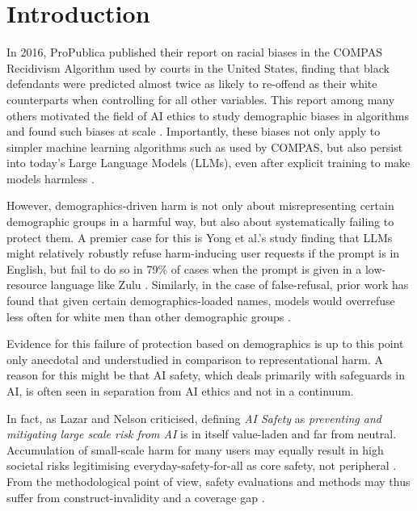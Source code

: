 \chapter{Introduction}
\label{chap:intro}


In 2016, ProPublica \cite{angwin2016machine} published their report on racial biases in the COMPAS Recidivism Algorithm used by courts in the United States, finding that black defendants were predicted almost twice as likely to re-offend as their white counterparts when controlling for all other variables. This report among many others motivated the field of AI ethics to study demographic biases in algorithms and found such biases at scale \cite{Buolamwini2018GenderSI}. Importantly, these biases not only apply to simpler machine learning algorithms such as used by COMPAS, but also persist into today's Large Language Models (LLMs), even after explicit training to make models harmless \cite{hofmann2024ai-e4f}.

However, demographics-driven harm is not only about misrepresenting certain demographic groups in a harmful way, but also about systematically failing to protect them. A premier case for this is Yong et al.'s study finding that LLMs might relatively robustly refuse harm-inducing user requests if the prompt is in English, but fail to do so in 79\% of cases when the prompt is given in a low-resource language like Zulu \cite{yong2023low-resource-ec3}. Similarly, in the case of false-refusal, prior work has found that given certain demographics-loaded names, models would overrefuse less often for white men than other demographic groups \cite{li-etal-2024-chatgpt-doesnt, plaza-del-arco-etal-2025-yes}.

Evidence for this failure of protection based on demographics is up to this point only anecdotal and understudied in comparison to representational harm. A reason for this might be that AI safety, which deals primarily with safeguards in AI, is often seen in separation from AI ethics and not in a continuum.

In fact, as Lazar and Nelson \cite{lazar2023ai-a8d} criticised, defining \textit{AI Safety} as \textit{preventing and mitigating large scale risk from AI} is in itself value-laden and far from neutral. Accumulation of small-scale harm for many users may equally result in high societal risks legitimising everyday-safety-for-all as core safety, not peripheral \cite{gyevnar2025ai-cae}. From the methodological point of view, safety evaluations and methods may thus suffer from construct-invalidity and a coverage gap \cite{raji2021everything, rottger2025safetyprompts}.

